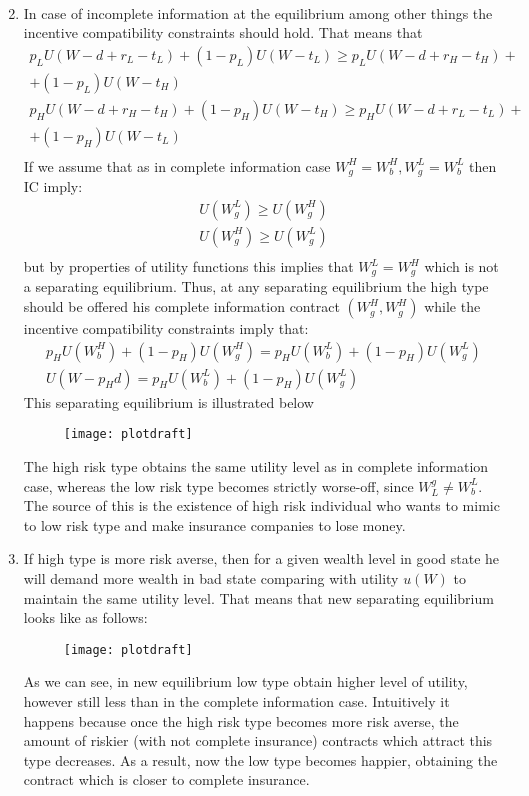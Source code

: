 \documentclass[a4paper]{article}
\begin{document}
\begin{enumerate}
\begin{align*}
\end{align*}
\item In case of incomplete information at the equilibrium among other things the incentive compatibility constraints should hold. That means that 
\begin{align*}
p_L U(W - d + r_L - t_L) + (1 - p_L)U(W - t_L) \ge p_L U(W - d + r_H - t_H) + \\
+(1 - p_L)U(W - t_H)\\
p_H U(W - d + r_H - t_H) + (1 - p_H)U(W - t_H) \ge p_H U(W - d + r_L - t_L) + \\
+ (1 - p_H)U(W - t_L)\\
\end{align*}
If we assume that as in complete information case $W_g^H = W_b^H, W_g^L = W_b^L$ then IC imply:
\begin{align*}
U(W^L_g) \ge U(W^H_g)\\
U(W^H_g) \ge U(W^L_g)\\
\end{align*}
but by properties of utility functions this implies that $W^L_g = W^H_g$ which is not a separating equilibrium. Thus, at any separating equilibrium the high type should be offered his complete information contract $(W_g^H, W_g^H)$ while the incentive compatibility constraints imply that:
\begin{align*}
p_HU(W_b^H) + (1 - p_H)U(W_g^H) = p_H U(W_b^L) + (1 - p_H)U(W_g^L)\\
U(W - p_Hd) = p_HU(W_b^L) + (1 -p_H)U(W_g^L)
\end{align*}
This separating equilibrium is illustrated below
	\begin{figure}[H]
	\centering
	\texttt{[image: plotdraft]}
	\caption{}\label{fig2}
\end{figure}
The high risk type obtains the same utility level as in complete information case, whereas the low risk type becomes strictly worse-off, since $W^g_L \neq W_b^L$. The source of this is the existence of high risk individual who wants to mimic to low risk type and make insurance companies to lose money.
\item If high type is more risk averse, then for a given wealth level in good state he will demand more wealth in bad state comparing with utility $u(W)$ to maintain the same utility level. That means that new separating equilibrium looks like as follows:
	\begin{figure}[H]
	\centering
	\texttt{[image: plotdraft]}
	\caption{}\label{fig3}
\end{figure}
As we can see, in new equilibrium low type obtain higher level of utility, however still less than in the complete information case. Intuitively it happens because once the high risk type becomes more risk averse, the amount of riskier (with not complete insurance) contracts which attract this type decreases. As a result, now the low type becomes happier, obtaining the contract which is closer to complete insurance. 
\end{enumerate}
\end{document}
